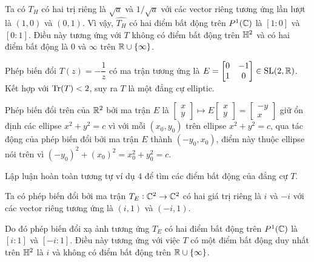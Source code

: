 \begin{exam*}
    Ta có $T_H$ có hai trị riêng là $\sqrt{a}$ và $1/\sqrt{a}$ với các vector riêng tương ứng lần lượt là $(1,0)$ và $(0,1)$. Vì vậy, $\widehat{T_H}$ có hai điểm bất động trên $P^1(\mathbb{C})$ là $[1:0]$ và $[0:1]$. Điều này tương ứng với $T$ không có điểm bất động trên $\mathbb{H}^2$ và có hai điểm bất động là $0$ và $\infty$ trên $\mathbb{R} \cup \{\infty\}$.
\end{exam*}
\begin{exam*}
Phép biến đổi $T(z) = -\dfrac{1}{z}$ có ma trận tương ứng là $E = \begin{bmatrix}
    0 & -1\\
    1 & 0
\end{bmatrix} \in \operatorname{SL}(2,\mathbb{R})$.
Kết hợp với $\operatorname{Tr}(T) < 2$, suy ra $T$ là một đẳng cự elliptic.

Phép biến đổi trên của $\mathbb{R}^2$ bởi ma trận $E$ là 
$\begin{bmatrix}
        x \\ y
    \end{bmatrix}
    \mapsto 
    E \begin{bmatrix}
        x \\ y
    \end{bmatrix} = \begin{bmatrix}
        -y\\ x 
    \end{bmatrix}$
 giữ ổn định các ellipse $x^2+y^2 = c$ vì với mỗi $(x_0,y_0)$ trên ellipse $x^2+y^2 = c$, qua tác động của phép biến đổi bởi ma trận $E$ thành $(-y_0,x_0)$, điểm này thuộc ellipse nói trên vì $(-y_0)^2+(x_0)^2 = x_0^2+y_0^2 = c$.
 
Lập luận hoàn toàn tương tự ví dụ $4$ để tìm các điểm bất động của đẳng cự $T$. 

Ta có phép biến đổi bởi ma trận $T_E:\mathbb{C}^2\to\mathbb{C}^2$ có hai giá trị riêng là $i$ và $-i$ với các vector riêng tương ứng là $(i,1)$ và $(-i,1)$. 

Do đó phép biến đổi xạ ảnh tương ứng $\widehat{T_E}$ có hai điểm bất động trên $P^1(\mathbb{C})$ là $[i:1]$ và $[-i:1]$. Điều này tương ứng với việc $T$ có một điểm bất động duy nhất trên $\mathbb{H}^2$ là $i$ và không có điểm bất động trên $\mathbb{R} \cup \{\infty\}$. 
\end{exam*}

